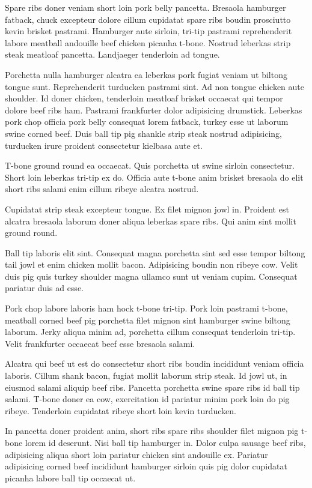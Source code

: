 Spare ribs doner veniam short loin pork belly pancetta. Bresaola hamburger fatback, chuck excepteur dolore cillum cupidatat spare ribs boudin prosciutto kevin brisket pastrami. Hamburger aute sirloin, tri-tip pastrami reprehenderit labore meatball andouille beef chicken picanha t-bone. Nostrud leberkas strip steak meatloaf pancetta. Landjaeger tenderloin ad tongue.

Porchetta nulla hamburger alcatra ea leberkas pork fugiat veniam ut biltong tongue sunt. Reprehenderit turducken pastrami sint. Ad non tongue chicken aute shoulder. Id doner chicken, tenderloin meatloaf brisket occaecat qui tempor dolore beef ribs ham. Pastrami frankfurter dolor adipisicing drumstick. Leberkas pork chop officia pork belly consequat lorem fatback, turkey esse ut laborum swine corned beef. Duis ball tip pig shankle strip steak nostrud adipisicing, turducken irure proident consectetur kielbasa aute et.

T-bone ground round ea occaecat. Quis porchetta ut swine sirloin consectetur. Short loin leberkas tri-tip ex do. Officia aute t-bone anim brisket bresaola do elit short ribs salami enim cillum ribeye alcatra nostrud.

Cupidatat strip steak excepteur tongue. Ex filet mignon jowl in. Proident est alcatra bresaola laborum doner aliqua leberkas spare ribs. Qui anim sint mollit ground round.

Ball tip laboris elit sint. Consequat magna porchetta sint sed esse tempor biltong tail jowl et enim chicken mollit bacon. Adipisicing boudin non ribeye cow. Velit duis pig quis turkey shoulder magna ullamco sunt ut veniam cupim. Consequat pariatur duis ad esse.

Pork chop labore laboris ham hock t-bone tri-tip. Pork loin pastrami t-bone, meatball corned beef pig porchetta filet mignon sint hamburger swine biltong laborum. Jerky aliqua minim ad, porchetta cillum consequat tenderloin tri-tip. Velit frankfurter occaecat beef esse bresaola salami.

Alcatra qui beef ut est do consectetur short ribs boudin incididunt veniam officia laboris. Cillum shank bacon, fugiat mollit laborum strip steak. Id jowl ut, in eiusmod salami aliquip beef ribs. Pancetta porchetta swine spare ribs id ball tip salami. T-bone doner ea cow, exercitation id pariatur minim pork loin do pig ribeye. Tenderloin cupidatat ribeye short loin kevin turducken.

In pancetta doner proident anim, short ribs spare ribs shoulder filet mignon pig t-bone lorem id deserunt. Nisi ball tip hamburger in. Dolor culpa sausage beef ribs, adipisicing aliqua short loin pariatur chicken sint andouille ex. Pariatur adipisicing corned beef incididunt hamburger sirloin quis pig dolor cupidatat picanha labore ball tip occaecat ut.

